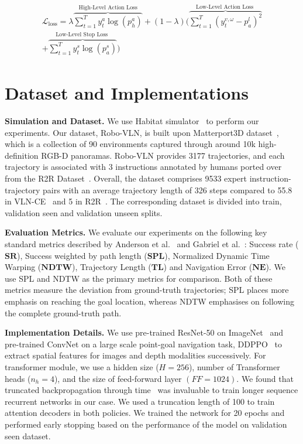 \documentclass[letter, 10pt, conference]{ieeeconf}
\begin{document}
\begin{multline*}
\begin{gathered}
\mathcal{L}_{\text {loss}}=\lambda \overbrace{\sum_{t=1}^{T} y_{t}^{a} \log \left(p^{a}_{h}\right)}^{\text {High-Level Action Loss}} + (1-\lambda) (\overbrace{\sum_{t=1}^{T}\left(y_{t}^{v,\omega}-p^{l}_{a}\right)^{2}}^{\text{Low-Level Action Loss }} \\ + \overbrace{\sum_{t=1}^{T} y^{s}_{t} \log \left(p^{s}_{a}\right)}^{\text{Low-Level Stop Loss }})
\end{gathered}
\end{multline*}

\section{Dataset and Implementations}
\textbf{Simulation and Dataset.}
We use Habitat simulator~\cite{habitat19iccv} to perform our experiments. Our dataset, Robo-VLN, is built upon Matterport3D dataset~\cite{Matterport3D}, which is a collection of 90 environments captured through around 10k high-definition RGB-D panoramas.
Robo-VLN provides 3177 trajectories, and each trajectory is associated with 3 instructions annotated by humans ported over from the R2R Dataset~\cite{mattersim}. Overall, the dataset comprises 9533 expert instruction-trajectory pairs with an average trajectory length of 326 steps compared to 55.8 in VLN-CE~\cite{krantz2020navgraph} and 5 in R2R~\cite{mattersim}. The corresponding dataset is divided into train, validation seen and validation unseen splits.

\textbf{Evaluation Metrics.} We evaluate our experiments on the following key standard metrics described by Anderson et al.~\cite{DBLP:journals/corr/abs-1807-06757} and Gabriel et al.~\cite{49206}: Success rate ($\textbf{SR}$), Success weighted by path length ($\textbf{SPL}$), Normalized Dynamic Time Warping ($\textbf{NDTW}$), Trajectory Length ($\textbf{TL}$) and Navigation Error ($\textbf{NE}$). We use SPL and NDTW as the primary metrics for comparison. Both of these metrics measure the deviation from ground-truth trajectories; SPL places more emphasis on reaching the goal location, whereas NDTW emphasises on following the complete ground-truth path. 

\textbf{Implementation Details.}
We use pre-trained ResNet-50 on ImageNet~\cite{7780459} and pre-trained ConvNet on a large scale point-goal navigation task, DDPPO~\cite{wijmans2020ddppo} to extract spatial features for images and depth modalities successively.
For transformer module, we use a hidden size ($H = 256$), number of Transformer heads ($n_{h}=4$), and the size of feed-forward layer $(FF=1024)$. We found that truncated backpropagation through time~\cite{sutskever2013training} was invaluable to train longer sequence recurrent networks in our case. We used a truncation length of 100 to train attention decoders in both policies. We trained the network for 20 epochs and performed early stopping based on the performance of the model on validation seen dataset.
\end{document}
